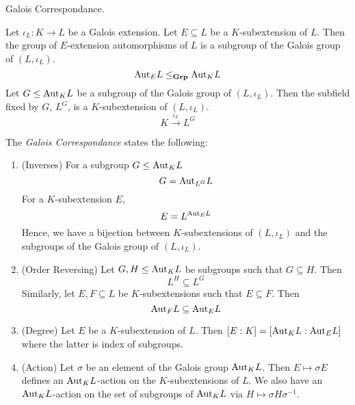 \documentclass[../book.tex]{subfiles}
\begin{document}
\begin{thm} Galois Correspondance. 
    
    Let $\iota_L : K \to L$ be a Galois extension.
    Let $E \subseteq L$ be a $K$-subextension of $L$. 
    Then the group of $E$-extension automorphisms of $L$ is
    a subgroup of the Galois group of $(L,\iota_L)$. \[
        \mathrm{Aut}_{E}L \leq_{\mathbf{Grp}} \mathrm{Aut}_{K}L
    \]
    Let $G \leq \mathrm{Aut}_{K}L$ be a subgroup of the Galois group of $(L,\iota_L)$. 
    Then the subfield fixed by $G$, $L^G$, is a $K$-subextension of $(L,\iota_L)$.
    \[ K \overset{\iota_L}{\to} L^G \]
    
    The \emph{Galois Correspondance} states the following: 
    \begin{enumerate}
        \item (Inverses)
            For a subgroup $G \leq \mathrm{Aut}_{K}L$ \[
                G = \mathrm{Aut}_{L^G}L
            \]
            For a $K$-subextension $E$, \[
                E = L^{\mathrm{Aut}_{E}L}
            \]
            Hence, we have a bijection between $K$-subextensions of $(L,\iota_L)$
            and the subgroups of the Galois group of $(L,\iota_L)$.
            
            \begin{figure} [H]
                \centering
            \end{figure}
            
            \item (Order Reversing) 
            Let $G, H \leq \mathrm{Aut}_{K}L$ be subgroups such that $G \subseteq H$.
            Then \[ L^H \subseteq L^G \]
            Similarly, 
            let $E, F \subseteq L$ be $K$-subextensions such that $E \subseteq F$.
            Then \[ \mathrm{Aut}_{F}L \subseteq \mathrm{Aut}_{E}L \]
        \item (Degree) 
            Let $E$ be a $K$-subextension of $L$. 
            Then $[E : K] = [\mathrm{Aut}_{K}L : \mathrm{Aut}_{E}L]$
            where the latter is index of subgroups. 
        \item (Action)
            Let $\sigma$ be an element of the Galois group $\mathrm{Aut}_{K}L$.
            Then $E \mapsto \sigma E$ defines an $\mathrm{Aut}_{K}L$-action
            on the $K$-subextensions of $L$. 
            We also have an $\mathrm{Aut}_{K}L$-action 
            on the set of subgroups of $\mathrm{Aut}_{K}L$ via 
            $H \mapsto \sigma H \sigma^{-1}$.
            

\end{enumerate}
\end{thm}
\end{document}
